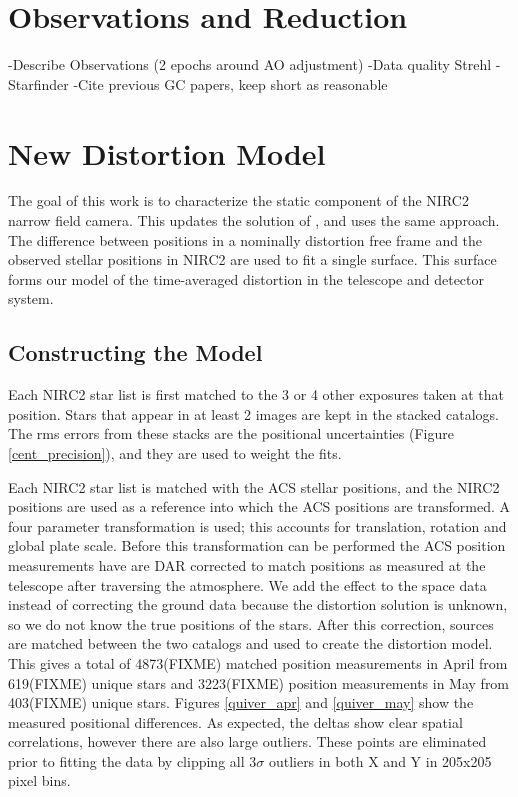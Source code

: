 \section{Observations and Reduction}
-Describe Observations (2 epochs around AO adjustment)
-Data quality Strehl
-Starfinder
-Cite previous GC papers, keep short as reasonable

\section{New Distortion Model}
The goal of this work is to characterize the static component of the NIRC2 narrow field camera.  This updates the solution of \cite{Yelda_2010}, and uses the same approach.  The difference between positions in a nominally distortion free frame and the observed stellar positions in NIRC2 are used to fit a single surface.  This surface forms our model of the time-averaged distortion  in the telescope and detector system.

\subsection{Constructing the Model}
Each NIRC2 star list is first matched to the 3 or 4 other exposures taken at that position.  Stars that appear in at least 2 images are kept in the stacked catalogs.  The rms errors from these stacks are the positional uncertainties (Figure \ref{cent_precision}), and they are used to weight the fits.

Each NIRC2 star list is matched with the ACS stellar positions, and the NIRC2 positions are used as a reference into which the ACS positions are transformed.  A four parameter transformation is used; this accounts for translation, rotation and global plate scale.  Before this transformation can be performed the ACS position measurements have are DAR corrected to match positions as measured at the telescope after traversing the atmosphere.  We add the effect to the space data instead of correcting the ground data because the distortion solution is unknown, so we do not know the true positions of the stars.  After this correction, sources are matched between the two catalogs and used to create the distortion model.  This gives a total of 4873(FIXME) matched position measurements in April from 619(FIXME) unique stars  and 3223(FIXME) position measurements in May from 403(FIXME) unique stars.  Figures \ref{quiver_apr} and \ref{quiver_may} show the measured positional differences.  As expected, the deltas show clear spatial correlations, however there are also large outliers.  These points are eliminated prior to fitting the data by clipping all 3$\sigma$ outliers in both X and Y in 205x205 pixel bins.  



